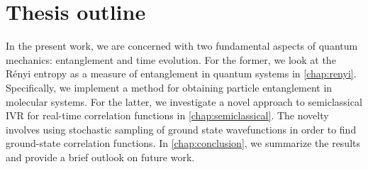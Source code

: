 \section{Thesis outline}

In the present work, we are concerned with two fundamental aspects of quantum mechanics: entanglement and time evolution.
For the former, we look at the Rényi entropy as a measure of entanglement in quantum systems in \cref{chap:renyi}.
Specifically, we implement a method for obtaining particle entanglement in molecular systems.
For the latter, we investigate a novel approach to semiclassical IVR for real-time correlation functions in \cref{chap:semiclassical}.
The novelty involves using stochastic sampling of ground state wavefunctions in order to find ground-state correlation functions.
In \cref{chap:conclusion}, we summarize the results and provide a brief outlook on future work.
